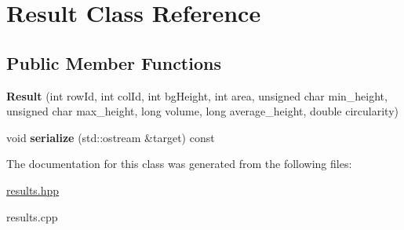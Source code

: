 \hypertarget{class_result}{}\section{Result Class Reference}
\label{class_result}
\subsection*{Public Member Functions}
\begin{DoxyCompactItemize}
\item 
\mbox{\label{class_result_acc26931e2c32fddb02413449b7f03278}} 
{\bfseries Result} (int row\+Id, int col\+Id, int bg\+Height, int area, unsigned char min\+\_\+height, unsigned char max\+\_\+height, long volume, long average\+\_\+height, double circularity)
\item 
\mbox{\label{class_result_a60cc412b37005131a08b776e63755ded}} 
void {\bfseries serialize} (std\+::ostream \&target) const
\end{DoxyCompactItemize}


The documentation for this class was generated from the following files\+:\begin{DoxyCompactItemize}
\item 
\hyperlink{results_8hpp}{results.\+hpp}\item 
results.\+cpp\end{DoxyCompactItemize}
